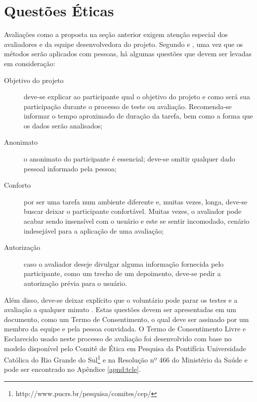 %

\section{Questões Éticas}

Avaliações como a proposta na seção anterior exigem atenção especial dos avaliadores e da equipe desenvolvedora do projeto. Segundo \cite{PRATES2003} e \cite{WINCKLER2002}, uma vez que os métodos serão aplicados com pessoas, há algumas questões que devem ser levadas em consideração:
    \begin{description}
        \item [Objetivo do projeto] deve-se explicar ao participante qual o objetivo do projeto e como será sua participação durante o processo de teste ou avaliação. Recomenda-se informar o tempo aproximado de duração da tarefa, bem como a forma que os dados serão analisados;
        \item [Anonimato] o anonimato do participante é essencial; deve-se omitir qualquer dado pessoal informado pela pessoa;
        \item [Conforto] por ser uma tarefa num ambiente diferente e, muitas vezes, longa, deve-se buscar deixar o participante confortável. Muitas vezes, o avaliador pode acabar sendo insensível com o usuário e este se sentir incomodado, cenário indesejável para a aplicação de uma avaliação;
        \item [Autorização] caso o avaliador deseje divulgar alguma informação fornecida pelo participante, como um trecho de um depoimento, deve-se pedir a autorização prévia para o usuário.
    \end{description}
Além disso, deve-se deixar explícito que o voluntário pode parar os testes e a avaliação a qualquer minuto \cite{PRATES2003}. Estas questões devem ser apresentadas em um documento, como um Termo de Consentimento, o qual deve ser assinado por um membro da equipe e pela pessoa convidada. O Termo de Consentimento Livre e Esclarecido usado neste processo de avaliação foi desenvolvido com base no modelo disponível pelo Comitê de Ética em Pesquisa da Pontifícia Universidade Católica do Rio Grande do Sul\footnote{http://www.pucrs.br/pesquisa/comites/cep/} e na Resolução nº 466 do Ministério da Saúde \cite{MSR466} e pode ser encontrado no Apêndice \ref{apnd:tcle}.
